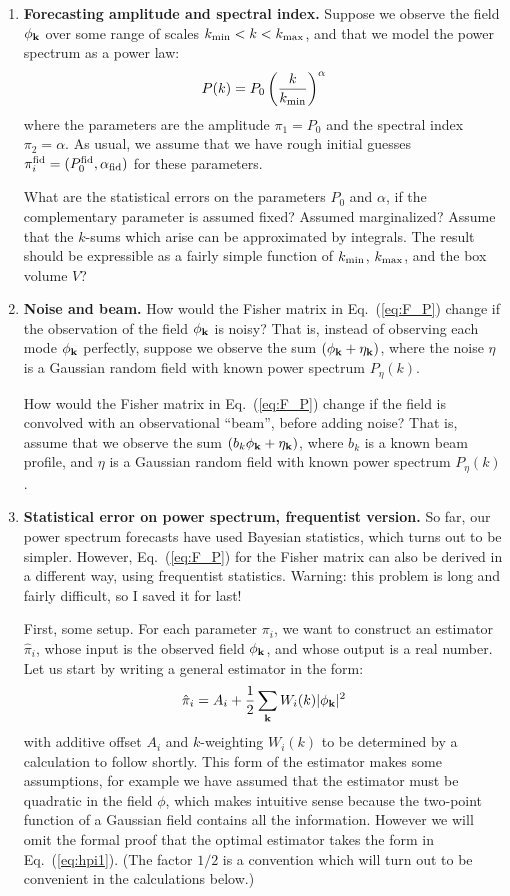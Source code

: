 \documentclass[aps,prd,superscriptaddress,groupedaddress,nofootinbib,nobibnotes]{revtex4}
\newcommand{\be}{\begin{equation}}
\newcommand{\ee}{\end{equation}}
\def\k{{\bf k}}
\def\hpi{{\hat\pi}}
\begin{document}
\begin{enumerate}
\item {\bf Forecasting amplitude and spectral index.}
  Suppose we observe the field $\phi_{\k}$ over some range of scales $k_{\rm min} < k < k_{\rm max}$,
  and that we model the power spectrum as a power law:
\be
  P(k) = P_0 \left( \frac{k}{k_{\rm min}} \right)^\alpha
\ee
  where the parameters are the amplitude $\pi_1 = P_0$ and the spectral index $\pi_2 = \alpha$.
  As usual, we assume that we have rough initial guesses $\pi_i^{\rm fid} = (P_0^{\rm fid}, \alpha_{\rm fid})$
  for these parameters.

  What are the statistical errors on the parameters $P_0$ and $\alpha$, if the complementary parameter
  is assumed fixed?  Assumed marginalized?
  Assume that the $k$-sums which arise can be approximated by integrals.
  The result should be expressible as a fairly simple function of $k_{\rm min}$, $k_{\rm max}$, and the box volume $V$?

\item {\bf Noise and beam.}
  How would the Fisher matrix in Eq.~(\ref{eq:F_P}) change if the observation of the field $\phi_{\k}$ is noisy?
  That is, instead of observing each mode $\phi_\k$ perfectly, suppose we observe the sum $(\phi_\k + \eta_\k)$, where
  the noise $\eta$ is a Gaussian random field with known power spectrum $P_\eta(k)$.

  How would the Fisher matrix in Eq.~(\ref{eq:F_P}) change if the field is convolved with an observational ``beam'', before adding noise?
  That is, assume that we observe the sum $(b_k \phi_\k + \eta_\k)$, where $b_k$ is a known beam profile,
  and $\eta$ is a Gaussian random field with known power spectrum $P_\eta(k)$.

\item 
  {\bf Statistical error on power spectrum, frequentist version.}
  So far, our power spectrum forecasts have used Bayesian statistics, which turns out to be simpler.
  However, Eq.~(\ref{eq:F_P}) for the Fisher matrix can also be derived in a different way, using frequentist statistics.
  Warning: this problem is long and fairly difficult, so I saved it for last!

  First, some setup.
  For each parameter $\pi_i$, we want to construct an estimator $\hpi_i$, whose input is the observed field $\phi_{\k}$,
  and whose output is a real number.  Let us start by writing a general estimator in the form:
\be
  \hpi_i = A_i + \frac{1}{2} \sum_{\k} W_i(k) |\phi_\k|^2  \label{eq:hpi1}
\ee
  with additive offset $A_i$ and $k$-weighting $W_i(k)$ to be determined by a calculation to follow shortly.
  This form of the estimator makes some assumptions, for example we have assumed that the estimator must be quadratic
  in the field $\phi$, which makes intuitive sense because the two-point function of a Gaussian field contains all
  the information.  However we will omit the formal proof that the optimal estimator takes the form in Eq.~(\ref{eq:hpi1}).
  (The factor $1/2$ is a convention which will turn out to be convenient in the calculations below.)


\end{enumerate}
\end{document}
